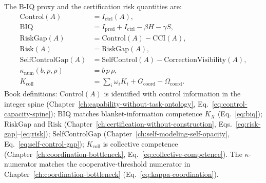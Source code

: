 \begin{definition}
\label{appi:def:spine-capability-risk}
The B-IQ proxy and the certification risk quantities are:
\begin{align}
\label{appi:eq:control}
\mathrm{Control}(A) &= I_{\mathrm{ctrl}}(A),\\
\label{appi:eq:biq}
\mathrm{BIQ} &= I_{\mathrm{pred}}+I_{\mathrm{ctrl}}-\beta H-\gamma S,\\
\label{appi:eq:risk-gap}
\mathrm{RiskGap}(A) &= \mathrm{Control}(A)-\mathrm{CCI}(A),\\
\label{appi:eq:risk}
\mathrm{Risk}(A) &= \mathrm{RiskGap}(A),\\
\label{appi:eq:self-control-gap}
\mathrm{SelfControlGap}(A) &= \mathrm{SelfControl}(A)-\mathrm{CorrectionVisibility}(A),\\
\label{appi:eq:kappa-numerator}
\kappa_{\mathrm{num}}(b,p,\rho) &= b\,p\,\rho,\\
\label{appi:eq:collective-competence}
K_{\mathrm{coll}} &= \sum_i \omega_i K_i + G_{\mathrm{coord}} - \Omega_{\mathrm{coord}} .
\end{align}
Book definitions: \(\mathrm{Control}(A)\) is identified with control information in the integer spine (Chapter~\ref{ch:capability-without-task-ontology}, Eq.~\eqref{eq:control-capacity-spine}); \(\mathrm{BIQ}\) matches blanket-information competence \(K_X\) (Eq.~\eqref{eq:biq}); \(\mathrm{RiskGap}\) and \(\mathrm{Risk}\) (Chapter~\ref{ch:certification-without-construction}, Eqs.~\eqref{eq:risk-gap}--\eqref{eq:risk}); \(\mathrm{SelfControlGap}\) (Chapter~\ref{ch:self-modeling-self-opacity}, Eq.~\eqref{eq:self-control-gap}); \(K_{\mathrm{coll}}\) is collective competence (Chapter~\ref{ch:coordination-bottleneck}, Eq.~\eqref{eq:collective-competence}).
The \(\kappa\)-numerator matches the cooperative-threshold numerator in Chapter~\ref{ch:coordination-bottleneck} (Eq.~\eqref{eq:kappa-coordination}).
\end{definition}

